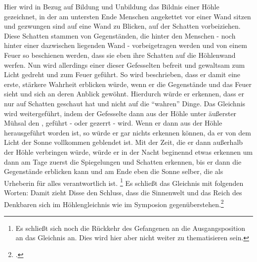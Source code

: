 Hier wird in Bezug auf Bildung und Unbildung das Bildnis einer Höhle gezeichnet, in der am untersten Ende Menschen angekettet vor einer Wand sitzen und gezwungen sind auf eine Wand zu Blicken, auf der Schatten vorbeiziehen. Diese Schatten stammen von Gegenständen, die hinter den Menschen - noch hinter einer dazwischen liegenden Wand - vorbeigetragen werden und von einem Feuer so beschienen werden, dass sie eben ihre Schatten auf die Höhlenwand werfen. Nun wird allerdings einer dieser Gefesselten befreit und gewaltsam zum Licht gedreht und zum Feuer geführt. So wird beschrieben, dass er damit eine erste, stärkere Wahrheit erblicken würde, wenn er die Gegenstände und das Feuer sieht und sich an deren Anblick gewöhnt. Hierdurch würde er erkennen, dass er nur auf Schatten geschaut hat und nicht auf die \enquote{wahren} Dinge. Das Gleichnis wird weitergeführt, indem der Gefesselte dann aus der Höhle unter äußerster Mühsal den , geführt - oder gezerrt - wird. Wenn er dann aus der Höhle herausgeführt worden ist, so würde er gar nichts erkennen können, da er von dem Licht der Sonne vollkommen geblendet ist. Mit der Zeit, die er dann außerhalb der Höhle verbringen würde, würde er in der Nacht beginennd etwas erkennen um dann am Tage zuerst die Spiegelungen und Schatten erkennen, bis er dann die Gegenstände erblicken kann und am Ende eben die Sonne selber, die als Urheberin für alles verantwortlich ist. \footnote{Es schließt sich noch die Rückkehr des Gefangenen an die Ausgangsposition an das Gleichnis an. Dies wird hier aber nicht weiter zu thematisieren sein.} Es schließt das Gleichnis mit folgenden Worten:
Damit zieht Disse den Schluss, dass die Sinnenwelt und das Reich des Denkbaren sich im Höhlengleichnis wie im Symposion gegenüberstehen.\footcite[vgl.][S. 28]{DisseMetaphysik}
